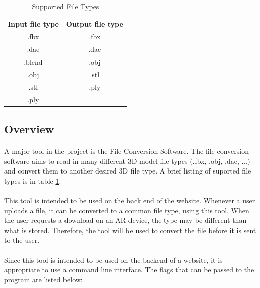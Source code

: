     \begin{table}[!h]
        \centering
        \begin{tabular}{| c | c |}
            \hline
            Input file type & Output file type \\
            \hline
            .fbx & .fbx \\
            .dae & .dae \\
            .blend & .obj \\ 
            .obj & .stl \\
            .stl & .ply \\
            .ply & \\
            \hline
        \end{tabular}
        \caption{Supported File Types}
        \label{table:suportedfiletypes}
    \end{table}

    \subsection{Overview}
    \paragraph{}
    A major tool in the project is the File Conversion Software.  
    The file conversion software aims to read in many different 3D model file types (.fbx, .obj, .dae, ...) and convert them to another desired 3D file type.  
    A brief listing of suported file types is in table \ref{table:suportedfiletypes}.

    \paragraph{}
    This tool is intended to be used on the back end of the website.  Whenever a user uploads a file, it can be converted to a common file type, using this tool.
    When the user requests a download on an AR device, the type may be different than what is stored.  Therefore, the tool will be used to convert the file before
    it is sent to the user.

    \paragraph{}
    Since this tool is intended to be used on the backend of a website, it is appropriate to use a command line interface.  
    The flags that can be passed to the program are listed below:

